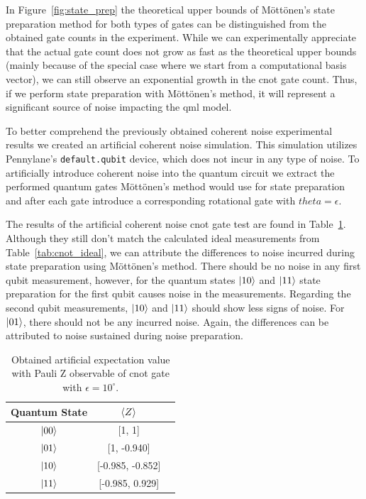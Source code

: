 In Figure~\ref{fig:state_prep} the theoretical upper bounds of
Möttönen's state preparation method for both types of gates can
be distinguished from the obtained gate counts in the experiment.
While we can experimentally appreciate that the actual gate count
does not grow as fast as the theoretical upper bounds (mainly because
of the special case where we start from a computational basis vector),
we can still observe an exponential growth in the \ac{cnot} gate count.
Thus, if we perform state preparation with Möttönen's method, it will
represent a significant source of noise impacting the \ac{qml} model. \

To better comprehend the previously obtained coherent noise experimental
results we created an artificial coherent noise simulation. This
simulation utilizes Pennylane's \colorbox{inline_gray}{\lstinline|default.qubit|}
device, which does not incur in any type of noise. To artificially
introduce coherent noise into the quantum circuit we extract the
performed quantum gates Möttönen's method would use for state
preparation and after each gate introduce a corresponding rotational
gate with \(theta = \epsilon\). \

The results of the artificial coherent noise \ac{cnot} gate test are found
in Table~\ref{tab:cnot_artificial_noise}. Although they still don't
match the calculated ideal measurements from Table~\ref{tab:cnot_ideal},
we can attribute the differences to noise incurred during state preparation
using Möttönen's method. There should be no noise in any first qubit
measurement, however, for the quantum states \(\ket{10}\) and \(\ket{11}\)
state preparation for the first qubit causes noise in the measurements.
Regarding the second qubit measurements, \(\ket{10}\) and \(\ket{11}\)
should show less signs of noise. For \(\ket{01}\), there should not be
any incurred noise. Again, the differences can be attributed to noise
sustained during noise preparation. \

\begin{table}[h]
  \centering
  \begin{tabular}{|c|c|c|}
    \hline
    Quantum State & \(\expval{Z}\) \\
    \hline
    \(\ket{00}\) & [1, 1] \\
    \hline
    \(\ket{01}\) & [1, -0.940] \\
    \hline
    \(\ket{10}\) & [-0.985, -0.852] \\
    \hline
    \(\ket{11}\) & [-0.985, 0.929] \\
    \hline
  \end{tabular}
  \caption{Obtained artificial expectation value with Pauli Z observable of \ac{cnot} gate with \(\epsilon = 10^{\circ}\).}\label{tab:cnot_artificial_noise}
\end{table} \

